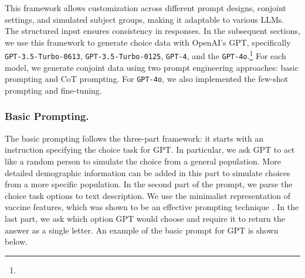 \vspace{10pt}

This framework allows customization across different prompt designs, conjoint settings, and simulated subject groups, making it adaptable to various LLMs. The structured input ensures consistency in responses. In the subsequent sections, we use this framework to generate choice data with OpenAI's GPT, specifically \texttt{GPT-3.5-Turbo-0613}, \texttt{GPT-3.5-Turbo-0125}, \texttt{GPT-4}, and the \texttt{GPT-4o}.\footnote{} For each model, we generate conjoint data using two prompt engineering approaches: basic prompting and CoT prompting. For \texttt{GPT-4o}, we also implemented the few-shot prompting and fine-tuning.

\subsubsection{Basic Prompting.}

 The basic prompting follows the three-part framework: it starts with an instruction specifying the choice task for GPT. In particular, we ask GPT to act like a random person to simulate the choice from a general population. More detailed demographic information can be added in this part to simulate choices from a more specific population. In the second part of the prompt, we parse the choice task options to text description. We use the minimalist representation of vaccine features, which was shown to be an effective prompting technique \citep{minimalistic}. In the last part, we ask which option GPT would choose and require it to return the answer as a single letter. An example of the basic prompt for GPT is shown below.
 
